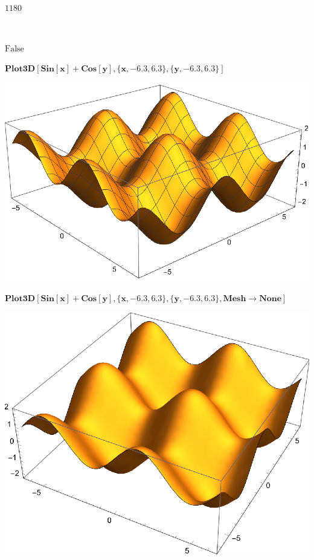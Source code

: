 \documentclass{article}
\begin{document}
\(\)

\begin{doublespace}
\noindent\(1180\)
\end{doublespace}

\(\)

\begin{doublespace}
\noindent\(\text{False}\)
\end{doublespace}

\begin{doublespace}
\noindent\(\pmb{\text{Plot3D}[\text{Sin}[x] + \text{Cos}[y], \{x, -6.3, 6.3\}, \{y, -6.3, 6.3\}]}\)
\end{doublespace}

\includegraphics{WLG_gr16.eps}

\begin{doublespace}
\noindent\(\pmb{\text{Plot3D}[\text{Sin}[x]+\text{Cos}[y],\{x,-6.3,6.3\},\{y,-6.3,6.3\},\text{Mesh}\to \text{None}]}\)
\end{doublespace}

\includegraphics{WLG_gr17.eps}
\end{document}
